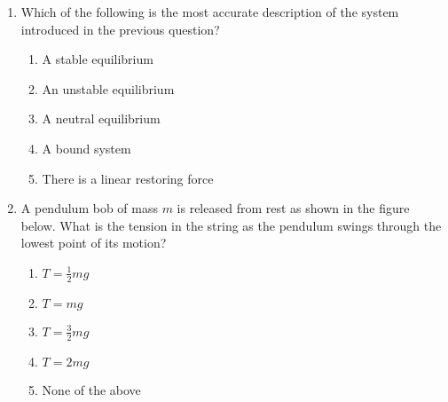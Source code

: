 \documentclass{../../../oss-classkick}
\begin{document}
\begin{multicols}{2}
\begin{enumerate}[resume,leftmargin=18pt]
  \item Which of the following is the most accurate description of the system
    introduced in the previous question?
    \label{q:well2}
    \begin{enumerate}[nosep,leftmargin=18pt,label=(\Alph*)]
    \item A stable equilibrium
    \item An unstable equilibrium
    \item A neutral equilibrium
    \item A bound system
    \item There is a linear restoring force
    \end{enumerate}
    
  \item A pendulum bob of mass $m$ is released from rest as shown in the figure
    below. What is the tension in the string as the pendulum swings through the
    lowest point of its motion?
    \begin{center}
    \end{center}
    \begin{enumerate}[nosep,leftmargin=18pt,label=(\Alph*)]
    \item $\displaystyle T=\frac{1}{2}mg$
    \item $T=mg$
    \item $\displaystyle T=\frac{3}{2}mg$
    \item $T=2mg$
    \item None of the above
    \end{enumerate}
    \vspace{.7in}
    

\end{enumerate}
\end{multicols}
\end{document}
